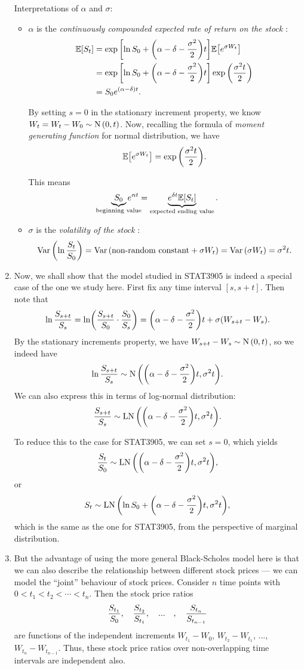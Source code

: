 \begin{enumerate}
Interpretations of \(\alpha\) and \(\sigma\):
\begin{itemize}
\item \(\alpha\) is the \emph{continuously compounded expected rate of return
on the stock }:
\begin{align*}
\mathbb{E}\qty[S_t]&=\exp\qty[\ln S_0+\qty(\alpha-\delta-\frac{\sigma^2}{2})t]\mathbb{E}\qty[e^{\sigma W_t}]\\
&=\exp\qty[\ln S_0+\qty(\alpha-\delta-\frac{\sigma^2}{2})t]\exp\qty(\frac{\sigma^2 t}{2})\\
&=S_0e^{(\alpha-\delta)t}.
\end{align*}
\begin{note}
By setting \(s=0\) in the stationary increment property, we know
\(W_t=W_t-W_0\sim \operatorname{N}\qty(0,t)\). Now, recalling the formula of \emph{moment
generating function} for normal distribution, we have
\[
\mathbb{E}\qty[e^{\sigma W_t}]=\exp\qty(\frac{\sigma^2 t}{2}).
\]
\end{note}

This means
\[
\underbrace{S_0}_{\mathclap{\text{beginning value}}}e^{\alpha t}
=\underbrace{e^{\delta t}\expv{S_t}}_{\text{expected ending value}}.
\]
\item \(\sigma\) is the \emph{volatility of the stock }:
\[
\operatorname{Var}\qty(\ln\frac{S_t}{S_0})
=\operatorname{Var}\qty(\text{non-random constant}+\sigma W_t)
=\operatorname{Var}\qty(\sigma W_t)
=\sigma^2t.
\]
\end{itemize}
\item Now, we shall show that the model studied in STAT3905 is indeed a special
case of the one we study here. First fix any time interval \([s,s+t]\).  Then
note that
\[
\ln\frac{S_{s+t}}{S_s}=\ln(\frac{S_{s+t}}{S_0}\cdot\frac{S_0}{S_s})
=\qty(\alpha-\delta-\frac{\sigma^2}{2})t+\sigma(W_{s+t}-W_s).
\]
By the stationary increments property, we have \(W_{s+t}-W_{s}\sim \operatorname{N}\qty(0,t)\), so
we indeed have
\[
\ln\frac{S_{s+t}}{S_s}\sim \operatorname{N}\qty(\qty(\alpha-\delta-\frac{\sigma^2}{2})t,\sigma^{2}t).
\]
We can also express this in terms of log-normal distribution:
\[
\frac{S_{s+t}}{S_s}\sim \operatorname{LN}\qty(\qty(\alpha-\delta-\frac{\sigma^2}{2})t,\sigma^{2}t).
\]

To reduce this to the case for STAT3905, we can set \(s=0\), which yields
\[
\frac{S_{t}}{S_0}\sim \operatorname{LN}\qty(\qty(\alpha-\delta-\frac{\sigma^2}{2})t,\sigma^{2}t),
\]
or
\[
S_t\sim \operatorname{LN}\qty(\ln S_0+\qty(\alpha-\delta-\frac{\sigma^2}{2})t,\sigma^{2}t),
\]
which is the same as the one for STAT3905, from the perspective of marginal
distribution.

\item \label{it:bs-indpt-price-ratios}
But the advantage of using the more general Black-Scholes model here is
that we can also describe the relationship between different stock prices ---
we can model the ``joint'' behaviour of stock prices. Consider \(n\) time
points with \(0<t_1<t_2<\dotsb<t_n\). Then the stock price ratios
\[
\frac{S_{t_1}}{S_{0}},\quad\frac{S_{t_2}}{S_{t_1}},\qqtext{...},\quad\frac{S_{t_n}}{S_{t_{n-1}}}
\]
are functions of the independent increments \(W_{t_1}-W_0\), \(W_{t_2}-W_{t_1}\),
..., \(W_{t_n}-W_{t_{n-1}}\). Thus, these stock price ratios over
non-overlapping time intervals are independent also.
\end{enumerate}
